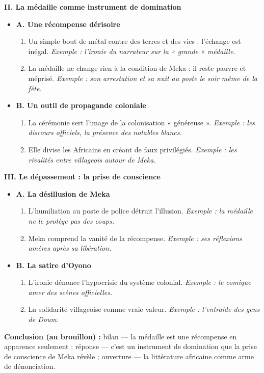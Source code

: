 \documentclass[11pt]{article}
\begin{document}
\begin{exoresolu}
\textbf{II. La médaille comme instrument de domination}
\begin{itemize}
\item \textbf{A. Une récompense dérisoire}
\begin{enumerate}
\item Un simple bout de métal contre des terres et des vies : l'échange est inégal. \emph{Exemple : l'ironie du narrateur sur la « grande » médaille.}
\item La médaille ne change rien à la condition de Meka : il reste pauvre et méprisé. \emph{Exemple : son arrestation et sa nuit au poste le soir même de la fête.}
\end{enumerate}
\item \textbf{B. Un outil de propagande coloniale}
\begin{enumerate}
\item La cérémonie sert l'image de la colonisation « généreuse ». \emph{Exemple : les discours officiels, la présence des notables blancs.}
\item Elle divise les Africains en créant de faux privilégiés. \emph{Exemple : les rivalités entre villageois autour de Meka.}
\end{enumerate}
\end{itemize}

\textbf{III. Le dépassement : la prise de conscience}
\begin{itemize}
\item \textbf{A. La désillusion de Meka}
\begin{enumerate}
\item L'humiliation au poste de police détruit l'illusion. \emph{Exemple : la médaille ne le protège pas des coups.}
\item Meka comprend la vanité de la récompense. \emph{Exemple : ses réflexions amères après sa libération.}
\end{enumerate}
\item \textbf{B. La satire d'Oyono}
\begin{enumerate}
\item L'ironie dénonce l'hypocrisie du système colonial. \emph{Exemple : le comique amer des scènes officielles.}
\item La solidarité villageoise comme vraie valeur. \emph{Exemple : l'entraide des gens de Doum.}
\end{enumerate}
\end{itemize}

\textbf{Conclusion (au brouillon) :} bilan — la médaille est une récompense en apparence seulement ; réponse — c'est un instrument de domination que la prise de conscience de Meka révèle ; ouverture — la littérature africaine comme arme de dénonciation.
\end{exoresolu}
\end{document}
